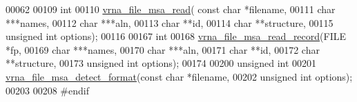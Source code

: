 \begin{DoxyCode}
00062 
00109 \textcolor{keywordtype}{int}
00110 \hyperlink{group__file__utils_gad02d5d12bda54611c915a1019323b7be}{vrna\_file\_msa\_read}( \textcolor{keyword}{const} \textcolor{keywordtype}{char} *filename,
00111                     \textcolor{keywordtype}{char} ***names,
00112                     \textcolor{keywordtype}{char} ***aln,
00113                     \textcolor{keywordtype}{char}  **\textcolor{keywordtype}{id},
00114                     \textcolor{keywordtype}{char}  **structure,
00115                     \textcolor{keywordtype}{unsigned} \textcolor{keywordtype}{int} options);
00116 
00167 \textcolor{keywordtype}{int}
00168 \hyperlink{group__file__utils_gad4203a438622b2df7bc2f16578d54799}{vrna\_file\_msa\_read\_record}(FILE *fp,
00169                           \textcolor{keywordtype}{char} ***names,
00170                           \textcolor{keywordtype}{char} ***aln,
00171                           \textcolor{keywordtype}{char}  **\textcolor{keywordtype}{id},
00172                           \textcolor{keywordtype}{char}  **structure,
00173                           \textcolor{keywordtype}{unsigned} \textcolor{keywordtype}{int} options);
00174 
00200 \textcolor{keywordtype}{unsigned} \textcolor{keywordtype}{int}
00201 \hyperlink{group__file__utils_gade4fa8136ebb2d0f7eb3f8b59a8658e3}{vrna\_file\_msa\_detect\_format}(\textcolor{keyword}{const} \textcolor{keywordtype}{char} *filename,
00202                             \textcolor{keywordtype}{unsigned} \textcolor{keywordtype}{int} options);
00203 
00208 \textcolor{preprocessor}{#endif}
\end{DoxyCode}
